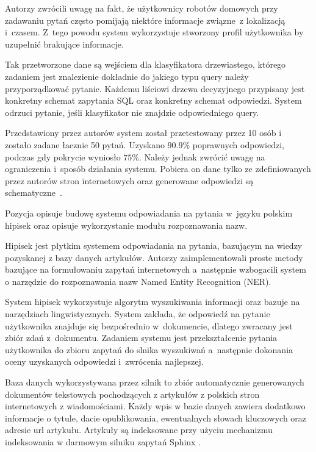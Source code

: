 Autorzy \cite{restrictedWeather} zwrócili uwagę na fakt, że użytkownicy robotów domowych przy zadawaniu pytań często pomijają niektóre informacje związne~z lokalizacją i~czasem. Z~tego powodu system wykorzystuje stworzony profil użytkownika by uzupełnić brakujące informacje.

Tak przetworzone dane są wejściem dla klasyfikatora drzewiastego, którego zadaniem jest znalezienie dokładnie do jakiego typu query należy przyporządkować pytanie. Każdemu liściowi drzewa decyzyjnego przypisany jest konkretny schemat zapytania SQL oraz konkretny schemat odpowiedzi. System odrzuci pytanie, jeśli klasyfikator nie znajdzie odpowiedniego query.

Przedstawiony przez autorów \cite{restrictedWeather} system został przetestowany przez 10 osób i~ zostało zadane łacznie 50 pytań. Uzyskano $\num{90.9}$\% poprawnych odpowiedzi, podczas gdy pokrycie wyniosło $\num{75}$\%. Należy jednak zwrócić uwagę na ograniczenia i~sposób działania systemu. Pobiera on dane tylko ze zdefiniowanych przez autorów stron internetowych oraz generowane odpowiedzi są schematyczne~\cite{restrictedWeather}.

Pozycja \cite{polishQAS} opisuje budowę systemu odpowiadania na pytania w~języku polskim hipisek oraz opisuje wykorzystanie modułu rozpoznawania nazw.

Hipisek jest płytkim systemem odpowiadania na pytania, bazującym na wiedzy pozyskanej z bazy danych artykułów. Autorzy zaimplementowali proste metody bazujące na formułowaniu zapytań internetowych a~następnie wzbogacili system o narzędzie do rozpoznawania nazw Named Entity Recognition (NER). 

System hipisek wykorzystuje algorytm wyszukiwania informacji oraz bazuje na narzędziach lingwistycznych. System zakłada, że odpowiedź na pytanie użytkownika znajduje się bezpośrednio w~dokumencie, dlatego zwracany jest zbiór zdań z~dokumentu.
Zadaniem systemu jest przekształcenie pytania użytkownika do zbioru zapytań do slnika wyszukiwań a~następnie dokonania oceny uzyskanych odpowiedzi i~zwrócenia najlepszej.

Baza danych wykorzystywana przez silnik to zbiór automatycznie generowanych dokumentów tekstowych pochodzących z artykułów z polskich stron internetowych z wiadomościami. Każdy wpis w bazie danych zawiera dodatkowo informacje o tytule, dacie opublikowania, ewentualnych słowach kluczowych oraz adresie url artykułu. Artykuły są indeksowane przy użyciu mechanizmu indeksowania w darmowym silniku zapytań Sphinx \cite{sphinx}. 

